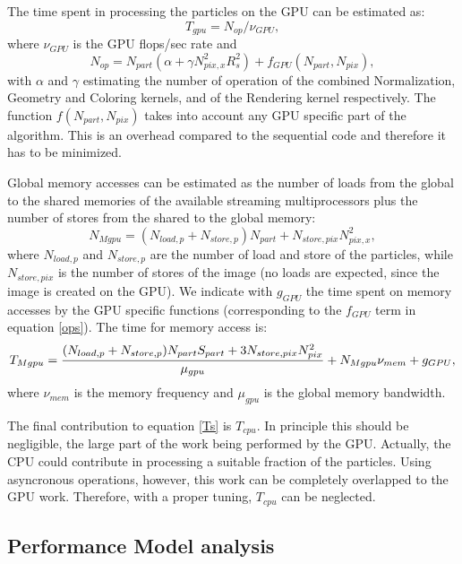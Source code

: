 \documentclass[11pt]{article}
\begin{document}
The time spent in processing the particles on the GPU can be estimated as:
\begin{equation}
T_{gpu} = N_{op}/\nu_{GPU},
\end{equation}
where $\nu_{GPU}$ is the GPU flops/sec rate and
\begin{equation}\label{ops}
N_{op} = N_{part}(\alpha + \gamma N_{pix,x}^2 R_s^2) + f_{GPU}(N_{part},N_{pix}),
\end{equation}
with $\alpha$ and $\gamma$ estimating the number of operation of 
the combined Normalization, Geometry and Coloring kernels,  
and of the Rendering kernel respectively. The function 
$f(N_{part},N_{pix})$ takes into account any GPU specific part of the algorithm. 
This is an overhead compared to the sequential code and therefore it has to 
be minimized.

Global memory accesses can be estimated 
as the number of loads from the global to the shared memories of the available 
streaming multiprocessors plus the number of stores from the shared to the global memory: 
\begin{equation}
N_{Mgpu} = (N_{load,p} + N_{store,p}) N_{part} + N_{store,pix} N_{pix,x}^2,
\end{equation}
where $N_{load,p}$ and $N_{store,p}$ are the number of load and store of the 
particles, while $N_{store,pix}$ is the number of stores of the image (no loads 
are expected, since the image is created on the GPU). 
We indicate with $g_{GPU}$ the time spent on memory accesses by the GPU specific 
functions (corresponding to the $f_{GPU}$ term in equation \eqref{ops}). 
The time for memory access is:
\begin{equation}
T_{Mgpu} = {(N_{load,p} + N_{store,p}) N_{part} S_{part} 
+ 3 N_{store,pix} N_{pix}^2\over \mu_{gpu}}
+ N_{Mgpu} \nu_{mem} + g_{GPU},
\end{equation}
where $\nu_{mem}$ is the memory frequency and $\mu_{gpu}$ is the global memory bandwidth.

The final contribution to equation \eqref{Ts} is $T_{cpu}$. In principle this should be negligible, 
the large part of the work being performed by the GPU. Actually, the CPU
could contribute in processing a suitable fraction of the particles. Using
asyncronous operations, however, this work can be completely overlapped 
to the GPU work. Therefore, with a proper tuning, $T_{cpu}$ can be neglected.

\subsection{Performance Model analysis}
\end{document}
